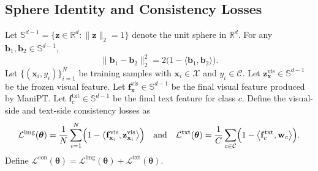 \documentclass{article}
\theoremstyle{plain}
\theoremstyle{definition}
\theoremstyle{remark}
\begin{document}
	\subsection{Sphere Identity and Consistency Losses}
	Let $\mathbb S^{d-1}=\{\mathbf{z}\in\mathbb R^d:\|\mathbf{z}\|_2=1\}$ denote the unit sphere in $\mathbb R^d$. For any $\mathbf{b}_1,\mathbf{b}_2\in\mathbb S^{d-1}$,
	\begin{equation*}
		\|\mathbf{b}_1-\mathbf{b}_2\|_2^2=2\bigl(1-\langle \mathbf{b}_1,\mathbf{b}_2\rangle\bigr).
	\end{equation*}
	Let $\{(\mathbf{x}_i,y_i)\}_{i=1}^N$ be training samples with $\mathbf{x}_i\in \mathcal{X}$ and $y_i\in \mathcal{C}$.
	Let $\mathbf{z}^{\mathrm{vis}}_{\mathbf{x}}\in\mathbb S^{d-1}$ be the frozen visual feature.
	Let $\mathbf{f}^{\mathrm{vis}}_{\mathbf{x}}\in\mathbb S^{d-1}$ be the final visual feature produced by ManiPT.
	Let $\mathbf{f}^{\mathrm{txt}}_{c}\in\mathbb S^{d-1}$ be the final text feature for class $c$.
	Define the visual-side and text-side consistency losses as
	\begin{equation*}
		\mathcal L^{\mathrm{img}}(\boldsymbol{\theta})
		=
		\frac{1}{N}\sum_{i=1}^N\Bigl(1-\bigl\langle \mathbf{f}^{\mathrm{vis}}_{\mathbf{x}_i},\mathbf{z}^{\mathrm{vis}}_{\mathbf{x}_i}\bigr\rangle\Bigr)
		\quad
		\text{and}
		\quad
		\mathcal L^{\mathrm{txt}}(\boldsymbol{\theta})
		=
		\frac{1}{C}\sum_{c\in \mathcal{C}}\Bigl(1-\bigl\langle \mathbf{f}^{\mathrm{txt}}_{c},\mathbf{w}_{c}\bigr\rangle\Bigr).
	\end{equation*}
	Define $\mathcal L^{\mathrm{con}}(\boldsymbol{\theta})=\mathcal L^{\mathrm{img}}(\boldsymbol{\theta})+\mathcal L^{\mathrm{txt}}(\boldsymbol{\theta})$.
\end{document}

